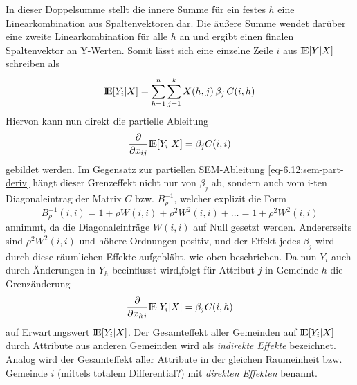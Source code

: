 In dieser Doppelsumme stellt die innere Summe für ein festes $h$ eine Linearkombination 
aus Spaltenvektoren dar. Die äußere Summe wendet darüber eine zweite Linearkombination 
für alle $h$ an und ergibt einen finalen Spaltenvektor an Y-Werten. Somit lässt sich eine 
einzelne Zeile $i$ aus $ {\rm I\!E}[Y|X]$ schreiben als
\begin{equation*}
    {\rm I\!E}[Y_{i}|X] = \sum_{h=1}^{n} \sum_{j=1}^{k}  X(h,j) \, \beta_{j} \, C(i,h)
\end{equation*}
Hiervon kann nun direkt die partielle Ableitung
\begin{equation*}
    \frac{\partial}{\partial x_{ij}} {\rm I\!E}[Y_{i}|X] = \beta_{j} C(i,i)
\end{equation*}
gebildet werden. Im Gegensatz zur partiellen SEM-Ableitung \eqref{eq-6.12:sem-part-deriv} hängt 
dieser Grenzeffekt nicht nur von $\beta_{j}$ ab, sondern 
auch vom i-ten Diagonaleintrag der Matrix $C$ bzw. $B_{\rho}^{-1}$, welcher explizit die Form
\begin{equation*}
    B_{\rho}^{-1}(i,i) = 1 + \rho W(i,i) + \rho^{2} W^{2}(i,i) + \ldots = 1 + \rho^{2} W^{2}(i,i)
\end{equation*}
annimmt, da die Diagonaleinträge $W(i,i)$ auf Null gesetzt werden. Andererseits 
sind $\rho^{2} W^{2}(i,i)$ und höhere Ordnungen positiv, und der Effekt jedes $\beta_{j}$ wird 
durch diese räumlichen Effekte aufgebläht, wie oben beschrieben. 
Da nun $Y_{i}$ auch durch Änderungen in $Y_{h}$ beeinflusst wird,folgt für 
Attribut $j$ in Gemeinde $h$ die Grenzänderung
\begin{equation*}
    \frac{\partial}{\partial x_{hj}} {\rm I\!E}[Y_{i}|X] = \beta_{j} C(i,h)
\end{equation*}
auf Erwartungswert ${\rm I\!E}[Y_{i}|X]$. Der Gesamteffekt aller Gemeinden auf ${\rm I\!E}[Y_{i}|X]$ 
durch Attribute aus anderen Gemeinden wird als \emph{indirekte Effekte} bezeichnet. 
Analog wird der Gesamteffekt aller Attribute in der gleichen 
Raumeinheit bzw. Gemeinde $i$ (mittels totalem Differential?) mit \emph{direkten Effekten} benannt.
\cite[S.335]{waller_applied_2004}


